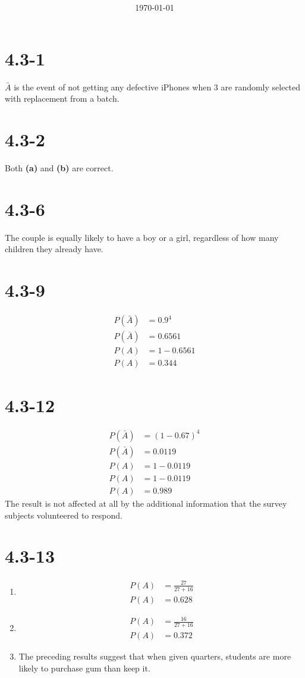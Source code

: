 \documentclass[12pt,fleqn]{article}
\title{\classdescription\ \\ \classname\ \\ $\ $ \\ \assignment}
\author{\authorname}
\date{\today}
\newcommand{\chapter}{4.3}
\newcommand{\problem}[1]{\vspace{5ex}\section*{\chapter-#1}}
\begin{document}
\maketitle

\problem{1}
$\bar{A}$ is the event of not getting any defective iPhones when 3 are randomly selected with replacement from a batch.


\problem{2}
Both \textbf{(a)} and \textbf{(b)} are correct.


\problem{6}
The couple is equally likely to have a boy or a girl, regardless of how many children they already have.


\problem{9}
\begin{align*}
  P(\bar{A}) &= 0.9^4 \\
  P(\bar{A}) &= 0.6561 \\
  P(A) &= 1 - 0.6561 \\
  P(A) &= 0.344
\end{align*}


\problem{12}
\begin{align*}
  P(\bar{A}) &= {(1 - 0.67)}^4 \\
  P(\bar{A}) &= 0.0119 \\
  P(A) &= 1 - 0.0119 \\
  P(A) &= 1 - 0.0119 \\
  P(A) &= 0.989
\end{align*}
The result is not affected at all by the additional information that the survey subjects volunteered to respond.


\problem{13}
\begin{enumerate}[label=\alph*.]
\item
  \begin{align*}
    P(A) &= \frac{27}{27 + 16} \\
    P(A) &= 0.628
  \end{align*}

\item
  \begin{align*}
    P(A) &= \frac{16}{27 + 16} \\
    P(A) &= 0.372
  \end{align*}

\item The preceding results suggest that when given quarters, students are more likely to purchase gum than keep it.
\end{enumerate}
\end{document}
